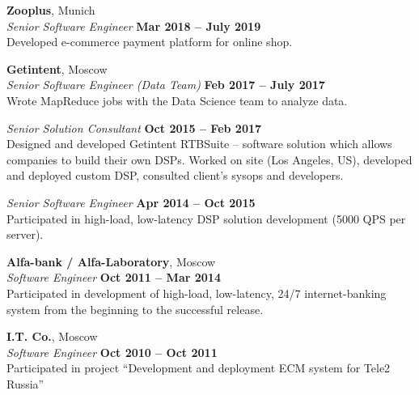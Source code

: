 \documentclass[margin,line]{resume}
\begin{document}
\begin{resume}
    \textbf{\listing Zooplus}, Munich \vspace{2mm}\\\vspace{1mm}%
    \textsl{Senior Software Engineer} \hfill \textbf{Mar 2018 – July 2019}\\
    Developed e-commerce payment platform for online shop. \vspace{1mm}

    \textbf{\listing Getintent}, Moscow \vspace{2mm}\\\vspace{1mm}%
    \textsl{Senior Software Engineer (Data Team)} \hfill \textbf{Feb 2017 – July 2017}\\
    Wrote MapReduce jobs with the Data Science team to analyze data. \vspace{1mm}

    \textsl{Senior Solution Consultant} \vspace{2mm}\hfill \textbf{Oct 2015 – Feb 2017}\\
    Designed and developed Getintent RTBSuite -- software solution which allows companies to build their own DSPs. Worked on site (Los Angeles, US), developed and deployed custom DSP, consulted client's sysops and developers. \vspace{1mm}

    \textsl{Senior Software Engineer} \vspace{2mm}\hfill \textbf{Apr 2014 – Oct 2015}\\
    Participated in high-load, low-latency DSP solution development (5000 QPS per server).

    \textbf{\listing Alfa-bank / Alfa-Laboratory}, Moscow \vspace{2mm}\\\vspace{1mm}%
    \textsl{Software Engineer} \hfill \textbf{Oct 2011 – Mar 2014}\\
    Participated in development of high-load, low-latency, 24/7 internet-banking system from the beginning to the successful release.

    \textbf{\listing I.T. Co.}, Moscow \vspace{2mm}\\\vspace{1mm}%
    \textsl{Software Engineer} \hfill \textbf{Oct 2010 – Oct 2011}\\
    Participated in project ``Development and deployment ECM system for Tele2 Russia''
    


\end{resume}
\end{document}
